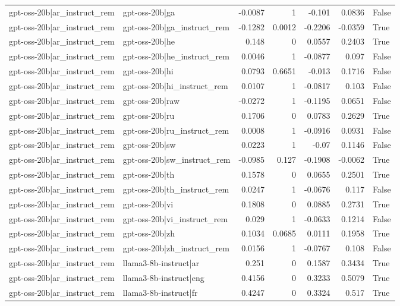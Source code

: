 \begin{table}
\begin{tabular}{l l r r r r l}
gpt-oss-20b|ar_instruct_rem & gpt-oss-20b|ga & -0.0087 & 1 & -0.101 & 0.0836 & False \\
gpt-oss-20b|ar_instruct_rem & gpt-oss-20b|ga_instruct_rem & -0.1282 & 0.0012 & -0.2206 & -0.0359 & True \\
gpt-oss-20b|ar_instruct_rem & gpt-oss-20b|he & 0.148 & 0 & 0.0557 & 0.2403 & True \\
gpt-oss-20b|ar_instruct_rem & gpt-oss-20b|he_instruct_rem & 0.0046 & 1 & -0.0877 & 0.097 & False \\
gpt-oss-20b|ar_instruct_rem & gpt-oss-20b|hi & 0.0793 & 0.6651 & -0.013 & 0.1716 & False \\
gpt-oss-20b|ar_instruct_rem & gpt-oss-20b|hi_instruct_rem & 0.0107 & 1 & -0.0817 & 0.103 & False \\
gpt-oss-20b|ar_instruct_rem & gpt-oss-20b|raw & -0.0272 & 1 & -0.1195 & 0.0651 & False \\
gpt-oss-20b|ar_instruct_rem & gpt-oss-20b|ru & 0.1706 & 0 & 0.0783 & 0.2629 & True \\
gpt-oss-20b|ar_instruct_rem & gpt-oss-20b|ru_instruct_rem & 0.0008 & 1 & -0.0916 & 0.0931 & False \\
gpt-oss-20b|ar_instruct_rem & gpt-oss-20b|sw & 0.0223 & 1 & -0.07 & 0.1146 & False \\
gpt-oss-20b|ar_instruct_rem & gpt-oss-20b|sw_instruct_rem & -0.0985 & 0.127 & -0.1908 & -0.0062 & True \\
gpt-oss-20b|ar_instruct_rem & gpt-oss-20b|th & 0.1578 & 0 & 0.0655 & 0.2501 & True \\
gpt-oss-20b|ar_instruct_rem & gpt-oss-20b|th_instruct_rem & 0.0247 & 1 & -0.0676 & 0.117 & False \\
gpt-oss-20b|ar_instruct_rem & gpt-oss-20b|vi & 0.1808 & 0 & 0.0885 & 0.2731 & True \\
gpt-oss-20b|ar_instruct_rem & gpt-oss-20b|vi_instruct_rem & 0.029 & 1 & -0.0633 & 0.1214 & False \\
gpt-oss-20b|ar_instruct_rem & gpt-oss-20b|zh & 0.1034 & 0.0685 & 0.0111 & 0.1958 & True \\
gpt-oss-20b|ar_instruct_rem & gpt-oss-20b|zh_instruct_rem & 0.0156 & 1 & -0.0767 & 0.108 & False \\
gpt-oss-20b|ar_instruct_rem & llama3-8b-instruct|ar & 0.251 & 0 & 0.1587 & 0.3434 & True \\
gpt-oss-20b|ar_instruct_rem & llama3-8b-instruct|eng & 0.4156 & 0 & 0.3233 & 0.5079 & True \\
gpt-oss-20b|ar_instruct_rem & llama3-8b-instruct|fr & 0.4247 & 0 & 0.3324 & 0.517 & True \\

\end{tabular}
\end{table}
